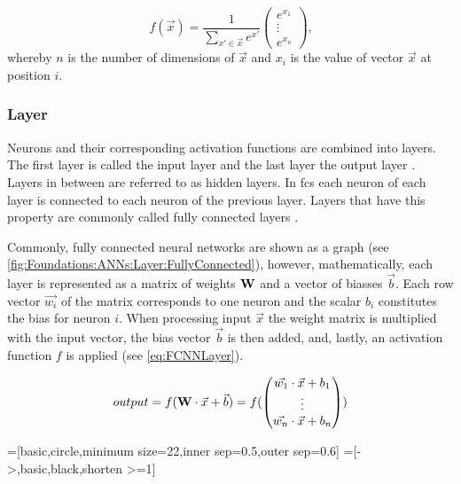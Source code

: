 $$
f(\vec{x}) = \frac{1}{\sum_{x' \in \vec{x}} e^{x'}} 
    \begin{pmatrix}
        e^{x_1}\\
        \vdots \\
        e^{x_{n}}
    \end{pmatrix} \text{,}
$$
whereby $n$ is the number of dimensions of $\vec{x}$ and $x_i$ is the value of vector $\vec{x}$ at position $i$.   

\subsubsection{Layer}
\label{sec:Foundations:NeuralNetworks:Layer}

Neurons and their corresponding activation functions are combined into layers. The first layer is called the input layer and the last layer the output layer \cite{nielsen2015neural}. Layers in between are referred to as hidden layers. In \acp{fc}  each neuron of each layer is connected to each neuron of the previous layer. Layers that have this property are commonly called fully connected layers . 

Commonly, fully connected neural networks are shown as a graph (see \autoref{fig:Foundations:ANNs:Layer:FullyConnected}), however, mathematically, each layer is represented as a matrix of weights $\mathbf{W}$ and a vector of biasses $\vec{b}$. Each row vector $\vec{w_i}$ of the matrix corresponds to one neuron and the scalar $b_i$ constitutes the bias for neuron $i$. When processing input $\vec{x}$ the weight matrix is multiplied with the input vector, the bias vector $\vec{b}$ is then added, and, lastly, an activation function $f$ is applied (see \autoref{eq:FCNNLayer}).

\begin{equation}
    \label{eq:FCNNLayer}
    output = f(\mathbf{W} \cdot \vec{x} + \vec{b}) = f( \begin{pmatrix}
        \vec{w_1} \cdot \vec{x} + b_1\\
        \vdots \\
        \vec{w_n} \cdot \vec{x} + b_n
      \end{pmatrix} )
\end{equation}

\tikzset{>=latex} %
=[basic,circle,minimum size=22,inner sep=0.5,outer sep=0.6]
=[->,basic,black,shorten >=1]
\def\nstyle{int(\lay<\Nnodlen?min(2,\lay):3)} %

